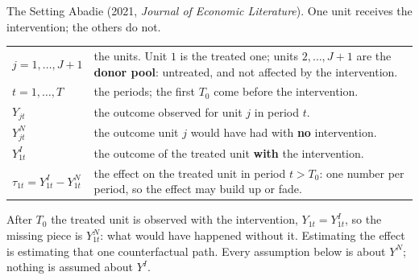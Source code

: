 \documentclass[main.tex]{subfiles}
\begin{document}
\begin{frame}{The Setting}
  \small
  Abadie (2021, \textit{Journal of Economic Literature}). One unit receives
  the intervention; the others do not.

  \medskip
  \begin{tabular}{@{}lp{8.4cm}@{}}
    \toprule
    $j = 1, \dots, J+1$ & the units. Unit $1$ is the treated one; units
      $2, \dots, J+1$ are the \textbf{donor pool}: untreated, and not affected
      by the intervention. \\[2pt]
    $t = 1, \dots, T$ & the periods; the first $T_0$ come before the
      intervention. \\[2pt]
    $Y_{jt}$ & the outcome observed for unit $j$ in period $t$. \\[2pt]
    $Y^{N}_{jt}$ & the outcome unit $j$ would have had with \textbf{no}
      intervention. \\[2pt]
    $Y^{I}_{1t}$ & the outcome of the treated unit \textbf{with} the
      intervention. \\[2pt]
    $\tau_{1t} = Y^{I}_{1t} - Y^{N}_{1t}$ & the effect on the treated unit in
      period $t > T_0$: one number per period, so the effect may build up or
      fade. \\
    \bottomrule
  \end{tabular}

  \medskip
  After $T_0$ the treated unit is observed with the intervention,
  $Y_{1t} = Y^{I}_{1t}$, so the missing piece is $Y^{N}_{1t}$: what would have
  happened without it. Estimating the effect is estimating that one
  counterfactual path. Every assumption below is about $Y^{N}$; nothing is
  assumed about $Y^{I}$.
\end{frame}
\end{document}
